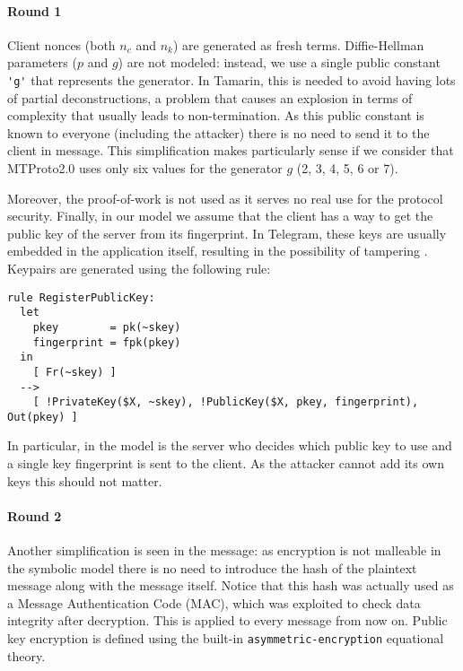 \lstset{language=tamarin}

\paragraph{Round 1}
Client nonces (both $n_c$ and $n_k$) are generated as fresh terms.
Diffie-Hellman parameters ($p$ and $g$) are not modeled: instead, we use a single public constant \lstinline{'g'} that represents the generator. In Tamarin, this is needed to avoid having lots of partial deconstructions, a problem that causes an explosion in terms of complexity that usually leads to non-termination. As this public constant is known to everyone (including the attacker) there is no need to send it to the client in  message. This simplification makes particularly sense if we consider that MTProto2.0 uses only six values for the generator $g$ (2, 3, 4, 5, 6 or 7).

Moreover, the proof-of-work is not used as it serves no real use for the protocol security. Finally, in our model we assume that the client has a way to get the public key of the server from its fingerprint. In Telegram, these keys are usually embedded in the application itself, resulting in the possibility of tampering \cite{MTProto2-Proverif}. Keypairs are generated using the following rule:

\begin{lstlisting}
rule RegisterPublicKey:
  let
    pkey        = pk(~skey)
    fingerprint = fpk(pkey)
  in
    [ Fr(~skey) ]
  -->
    [ !PrivateKey($X, ~skey), !PublicKey($X, pkey, fingerprint), Out(pkey) ]
\end{lstlisting}

In particular, in the model is the server who decides which public key to use and a single key fingerprint is sent to the client. As the attacker cannot add its own keys this should not matter.

\paragraph{Round 2} Another simplification is seen in the  message: as encryption is not malleable in the symbolic model there is no need to introduce the hash of the plaintext message along with the message itself. Notice that this hash was actually used as a Message Authentication Code (MAC), which was exploited to check data integrity after decryption. This is applied to every message from now on. Public key encryption is defined using the built-in \lstinline{asymmetric-encryption} equational theory.

